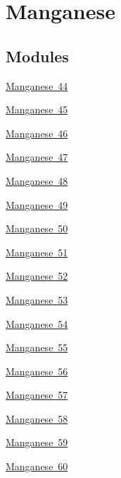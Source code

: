 \hypertarget{group___isotope_const-_manganese}{}\section{Manganese}
\label{group___isotope_const-_manganese}
\subsection*{Modules}
\begin{DoxyCompactItemize}
\item 
\mbox{\hyperlink{group___isotope_const-_manganese-_mn44}{Manganese 44}}
\item 
\mbox{\hyperlink{group___isotope_const-_manganese-_mn45}{Manganese 45}}
\item 
\mbox{\hyperlink{group___isotope_const-_manganese-_mn46}{Manganese 46}}
\item 
\mbox{\hyperlink{group___isotope_const-_manganese-_mn47}{Manganese 47}}
\item 
\mbox{\hyperlink{group___isotope_const-_manganese-_mn48}{Manganese 48}}
\item 
\mbox{\hyperlink{group___isotope_const-_manganese-_mn49}{Manganese 49}}
\item 
\mbox{\hyperlink{group___isotope_const-_manganese-_mn50}{Manganese 50}}
\item 
\mbox{\hyperlink{group___isotope_const-_manganese-_mn51}{Manganese 51}}
\item 
\mbox{\hyperlink{group___isotope_const-_manganese-_mn52}{Manganese 52}}
\item 
\mbox{\hyperlink{group___isotope_const-_manganese-_mn53}{Manganese 53}}
\item 
\mbox{\hyperlink{group___isotope_const-_manganese-_mn54}{Manganese 54}}
\item 
\mbox{\hyperlink{group___isotope_const-_manganese-_mn55}{Manganese 55}}
\item 
\mbox{\hyperlink{group___isotope_const-_manganese-_mn56}{Manganese 56}}
\item 
\mbox{\hyperlink{group___isotope_const-_manganese-_mn57}{Manganese 57}}
\item 
\mbox{\hyperlink{group___isotope_const-_manganese-_mn58}{Manganese 58}}
\item 
\mbox{\hyperlink{group___isotope_const-_manganese-_mn59}{Manganese 59}}
\item 
\mbox{\hyperlink{group___isotope_const-_manganese-_mn60}{Manganese 60}}
\item 

\end{DoxyCompactItemize}
